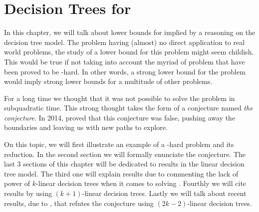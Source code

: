 \chapter{Decision Trees for \threeSUM}
\label{tree:3sum}

In this chapter, we will talk about lower bounds for \threeSUM implied by
a reasoning on the decision tree model. The \threeSUM problem having (almost) no
direct application to real world problems, the study of a lower bound for this
problem might seem childish. This would be true if not taking into
account the myriad of problem that have been proved to be \threeSUM-hard. In
other words, a strong lower bound for the \threeSUM problem would imply strong
lower bounds for a multitude of other problems.

For a long time we thought that it was not possible to solve the \threeSUM
problem in subquadratic time. This strong thought takes the form of a
conjecture named \emph{the \threeSUM conjecture}. In 2014, \citet*{gronlund:2014}
proved that this conjecture was false, pushing away the
boundaries and leaving us with new paths to explore.

On this topic, we will first illustrate an example of a \threeSUM-hard problem
and its reduction. In the second section we will formally enunciate the
\threeSUM conjecture. The last 3 sections of this chapter will be dedicated to results
in the linear decision tree model. The third one will explain results due to
\citet*{erickson:1999} commenting the lack of power of $k$-linear
decision trees when it comes to solving \ksum. Fourthly we will cite
results by \citet*{ailon:2005} using $(k+1)$-linear decision trees.
Lastly we will talk about recent results, due to \citet*{gronlund:2014}, that
refutes the \threeSUM conjecture using $(2k-2)$-linear decision trees.
